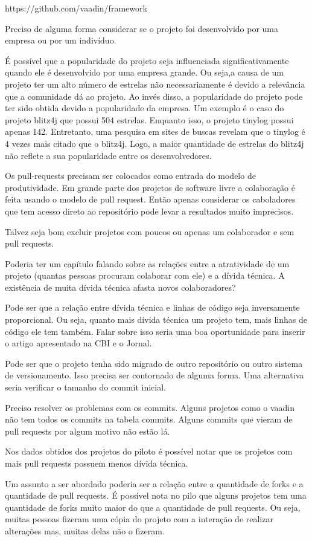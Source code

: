 https://github.com/vaadin/framework




Preciso de alguma forma considerar se o projeto foi desenvolvido por uma empresa ou por um indivíduo.

É possível que a popularidade do projeto seja influenciada significativamente quando ele é desenvolvido por uma empresa grande. Ou seja,a causa de um projeto ter um alto número de estrelas não necessariamente é devido a relevância que a comunidade dá ao projeto. Ao invés disso, a popularidade do projeto pode ter sido obtida devido a popularidade da empresa. Um exemplo é o caso do projeto blitz4j que possui 504 estrelas. Enquanto isso, o projeto tinylog possui apenas 142. Entretanto, uma pesquisa em sites de buscas revelam que o tinylog é 4 vezes mais citado que o blitz4j. Logo, a maior quantidade de estrelas do blitz4j não reflete a sua popularidade entre os desenvolvedores.

Os pull-requests precisam ser colocados como entrada do modelo de produtividade. Em grande parte dos projetos de software livre a colaboração é feita usando o modelo de pull request. Então apenas considerar os caboladores que tem acesso direto ao repositório pode levar a resultados muito imprecisos.


Talvez seja bom excluir projetos com poucos ou apenas um colaborador e sem pull requests. 


Poderia ter um capítulo falando sobre as relações entre a atratividade de um projeto (quantas pessoas procuram colaborar com ele) e a dívida técnica.
A existência de muita dívida técnica afasta novos colaboradores?


Pode ser que a relação entre dívida técnica e linhas de código seja inversamente proporcional. Ou seja, quanto mais dívida técnica um projeto tem, mais linhas de código ele tem também. Falar sobre isso seria uma boa oportunidade para inserir o artigo apresentado na CBI e o Jornal.

Pode ser que o projeto tenha sido migrado de outro repositório ou outro sistema de versionamento. Isso precisa ser contornado de alguma forma. Uma alternativa seria verificar o tamanho do commit inicial.


Preciso resolver os problemas com os commits. Alguns projetos como o vaadin não tem todos os commits na tabela commits. Alguns commits que vieram de pull requests por algum motivo não estão lá.

Nos dados obtidos dos projetos do piloto é possível notar que os projetos com mais pull requests possuem menos dívida técnica.

Um assunto a ser abordado poderia ser a relação entre a quantidade de forks e a quantidade de pull requests. É possível nota no pilo que alguns projetos tem uma quantidade de forks muito maior do que a quantidade de pull requests. Ou seja, muitas pessoas fizeram uma cópia do projeto com a interação de realizar alterações mas, muitas delas não o fizeram.

